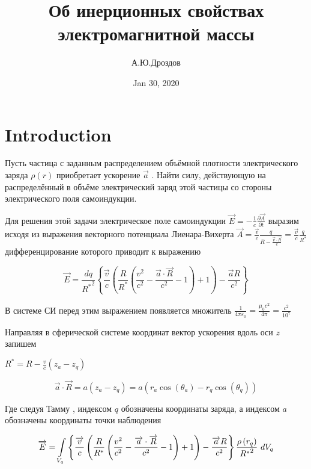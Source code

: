\documentclass{article}
\begin{document}
\title{Об инерционных свойствах электромагнитной массы}

\author{А.Ю.Дроздов}

\date{Jan 30, 2020}



\section{Introduction}



Пусть частица с заданным распределением объёмной плотности электрического заряда $\rho \left( r \right)$ приобретает ускорение $\overrightarrow{a}$ . Найти силу, действующую на распределённый в объёме электрический заряд этой частицы со стороны электрического поля самоиндукции.

Для решения этой задачи электрическое поле самоиндукции $\overrightarrow{E}=-\frac{1}{c}\frac{\partial \overrightarrow{A}}{\partial t}$
выразим исходя из выражения векторного потенциала Лиенара-Вихерта \cite{LL2} $\overrightarrow{A}=\frac{\overrightarrow{v}}{c}\frac{q}{R-\frac{\overrightarrow{v}\cdot \overrightarrow{R}}{c}}=\frac{\overrightarrow{v}}{c}\frac{q}{{{R}^{*}}}$ дифференцирование которого приводит к выражению \cite{rustot}

\[\overrightarrow{E}=\frac{dq}{{{R}^{*}}^{2}}\left\{ \frac{\overrightarrow{v}}{c}\left( \frac{R}{{{R}^{*}}}\left( \frac{{{v}^{2}}}{{{c}^{2}}}-\frac{\overrightarrow{a}\cdot \overrightarrow{R}}{{{c}^{2}}}-1 \right)+1 \right)-\frac{\overrightarrow{a}R}{{{c}^{2}}} \right\}\]

В системе СИ перед этим выражением появляется множитель $\frac{1}{4\pi {{\varepsilon }_{0}}}=\frac{{{\mu }_{0}}{{c}^{2}}}{4\pi }=\frac{{{c}^{2}}}{{{10}^{7}}}$

Направляя в сферической системе координат вектор ускорения вдоль оси $z$  запишем

${{R}^{*}}=R-\frac{v}{c}\left( {{z}_{a}}-{{z}_{q}} \right)$

\[\overrightarrow{a}\cdot \overrightarrow{R}=a\left( {{z}_{a}}-{{z}_{q}} \right)=a\left( {{r}_{a}}\cos \left( {{\theta }_{a}} \right)-{{r}_{q}}\cos \left( {{\theta }_{q}} \right) \right)\]

Где следуя Тамму \cite{tamm}, индексом $q$ обозначены координаты заряда, а индексом $a$ обозначены координаты точки наблюдения

\[\overrightarrow{E}=\int\limits_{{{V}_{q}}}\\
{\left\{ \frac{\overrightarrow{v}}{c}\left( \frac{R}{{{R}^{*}}}\left( \frac{{{v}^{2}}}{{{c}^{2}}}-\frac{\overrightarrow{a}\cdot \overrightarrow{R}}{{{c}^{2}}}-1 \right)+1 \right)-\frac{\overrightarrow{a}R}{{{c}^{2}}} \right\}\frac{\rho \left( {{r}_{q}} \right)}{{{R}^{*}}^{2}}\ }d{{V }_{q}}\]
\end{document}
